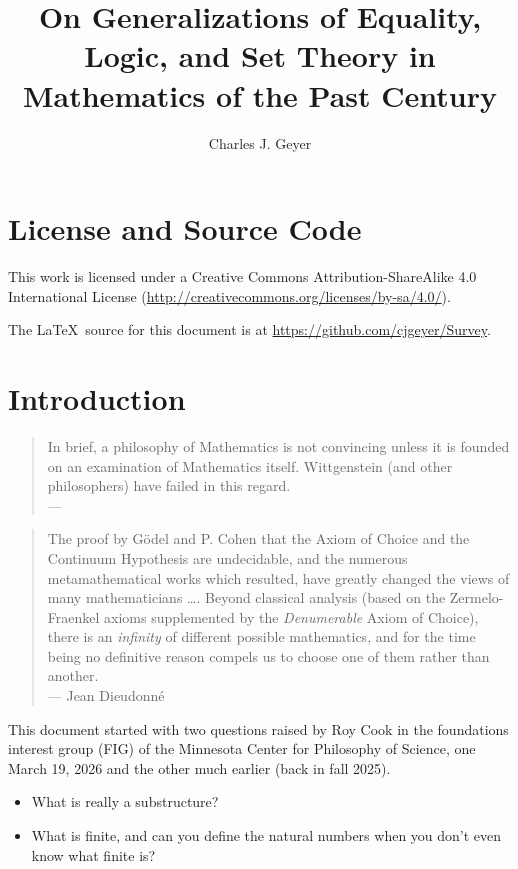\documentclass[11pt]{article}
\begin{document}
\title{On Generalizations of Equality, Logic, and Set Theory
    in Mathematics of the Past Century}
\author{Charles J. Geyer}
\maketitle

\tableofcontents

\section{License and Source Code}

This work is licensed under a Creative Commons
Attribution-ShareAlike 4.0 International License
(\url{http://creativecommons.org/licenses/by-sa/4.0/}).

The \LaTeX\ source for this document is
at \url{https://github.com/cjgeyer/Survey}.

\pagebreak[3]
\section{Introduction}

\begin{quotation}
In brief, a philosophy of Mathematics is not convincing unless it is
founded on an examination of Mathematics itself.
Wittgenstein (and other philosophers) have failed in this regard.
\\
\hspace*{\fill} --- \citet{maclane}
\end{quotation}
\begin{quotation}
The proof by G\"{o}del and P. Cohen that the Axiom of Choice and the
Continuum Hypothesis are undecidable, and the numerous metamathematical
works which resulted, have greatly changed the views of many mathematicians
\ldots.  Beyond classical analysis (based on the Zermelo-Fraenkel axioms
supplemented by the \emph{Denumerable} Axiom of Choice),
there is an \emph{infinity} of different
possible mathematics, and for the time being no definitive reason compels
us to choose one of them rather than another.
\\
\hspace*{\fill}
--- Jean Dieudonn\'{e} \citep[cited by][p.~4]{moore}
\end{quotation}

This document started with two questions raised by Roy Cook
in the foundations interest
group (FIG) of the Minnesota Center for Philosophy of Science, one March 19,
2026 and the other much earlier (back in fall 2025).
\begin{itemize}
\item What is really a substructure?
\item What is finite, and can you define the natural
    numbers when you don't even know what finite is?
\end{itemize}
\end{document}
